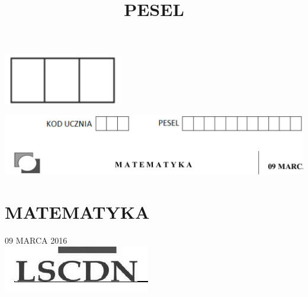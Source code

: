 \documentclass[10pt]{article}
\title{PESEL }
\author{}
\date{}
\begin{document}
\maketitle
\begin{center}
\includegraphics[max width=\textwidth]{2024_11_21_9d761ca624f0efee99a4g-01}
\end{center}

\begin{center}
\includegraphics[max width=\textwidth]{2024_11_21_9d761ca624f0efee99a4g-01(2)}
\end{center}

\section*{MATEMATYKA}
09 MARCA 2016\\
\includegraphics[max width=\textwidth, center]{2024_11_21_9d761ca624f0efee99a4g-01(1)}
\end{document}
